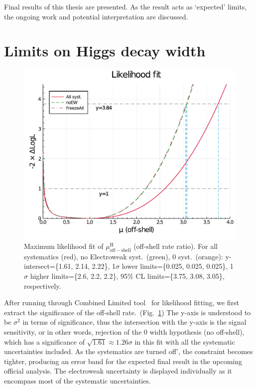 Final results of this thesis are presented. As the result acts as
`expected' limits, the ongoing work and potential interpretation are discussed.
\pagebreak
\section{Limits on Higgs decay width}
\begin{figure}[htb]
    \centering
    \includegraphics[width=.8\linewidth]{fig/Final_fit_mu_offshell.pdf}
    \caption{Maximum likelihood fit of $\mu^\mathrm{H}_\mathrm{off-shell}$ (off-shell rate ratio).
    For all systematics (red), no Electroweak syst.~(green),
    0 syst.~(orange): y-intersect=\{1.61, 2.14, 2.22\}, 1$\sigma$ lower limits=\{0.025, 0.025, 0.025\},
1$\sigma$ higher limits=\{2.6, 2.2, 2.2\}, 95\% CL limits=\{3.75, 3.08, 3.05\}, respectively.}
    \label{fig:final_fit_mu}
\end{figure}
After running through Combined Limited tool~\cite{combine1, combine2, combine3} for likelihood fitting, we first extract the significance
of the off-shell rate.~(Fig.~\ref{fig:final_fit_mu})
The y-axis is understood to be $\sigma^2$ in terms of significance, thus
the intersection with the y-axis is the signal sensitivity, or in other words,
rejection of the 0 width hypothesis (no off-shell), which has a significance of 
$\sqrt{1.61} \approx 1.26\sigma$ in this fit with all the systematic uncertainties included.
As the systematics are turned off', the constraint becomes tighter, producing an error band for the expected
final result in the upcoming official analysis. The electroweak uncertainty is displayed individually as
it encompass most of the systematic uncertainties.

